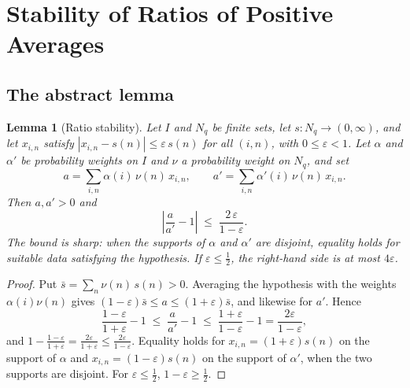 \documentclass[12pt,a4paper]{article}
\newtheorem{lemma}[theorem]{Lemma}
\theoremstyle{definition}
\theoremstyle{remark}
\newcommand{\Nq}{N_q}
\begin{document}
  \section{Stability of Ratios of Positive Averages}\label{sec:su2}

    \subsection{The abstract lemma}

      \begin{lemma}[Ratio stability]\label{lem:su2-isotropy}
        Let $I$ and $\Nq$ be finite sets, let $s \colon \Nq \to (0, \infty)$, and let $x_{i,n}$ satisfy
        $|x_{i,n} - s(n)| \leq \varepsilon\,s(n)$ for all $(i, n)$, with $0 \leq \varepsilon < 1$.
        Let $\alpha$ and $\alpha'$ be probability weights on $I$ and $\nu$ a probability weight on $\Nq$, and set
        \[
          a = \sum_{i,n} \alpha(i)\,\nu(n)\,x_{i,n}, \qquad
          a' = \sum_{i,n} \alpha'(i)\,\nu(n)\,x_{i,n}.
        \]
        Then $a, a' > 0$ and
        \begin{equation}\label{eq:ratio-bound}
          \left|\frac{a}{a'} - 1\right| \;\leq\; \frac{2\,\varepsilon}{1 - \varepsilon}.
        \end{equation}
        The bound is sharp: when the supports of $\alpha$ and $\alpha'$ are disjoint, equality holds for suitable data
        satisfying the hypothesis.
        If $\varepsilon \leq \frac12$, the right-hand side is at most $4\varepsilon$.
      \end{lemma}

      \begin{proof}
        Put $\bar s = \sum_n \nu(n)\,s(n) > 0$.
        Averaging the hypothesis with the weights $\alpha(i)\nu(n)$ gives
        $(1-\varepsilon)\bar s \leq a \leq (1+\varepsilon)\bar s$, and likewise for $a'$.
        Hence
        \[
          \frac{1-\varepsilon}{1+\varepsilon} - 1 \;\leq\; \frac{a}{a'} - 1
          \;\leq\; \frac{1+\varepsilon}{1-\varepsilon} - 1
          = \frac{2\varepsilon}{1-\varepsilon},
        \]
        and
        $1 - \frac{1-\varepsilon}{1+\varepsilon} = \frac{2\varepsilon}{1+\varepsilon}
        \leq \frac{2\varepsilon}{1-\varepsilon}$.
        Equality holds for $x_{i,n} = (1+\varepsilon)s(n)$ on the support of $\alpha$ and
        $x_{i,n} = (1-\varepsilon)s(n)$ on the support of $\alpha'$, when the two supports are disjoint.
        For $\varepsilon \leq \frac12$, $1 - \varepsilon \geq \frac12$.
      \end{proof}
\end{document}
